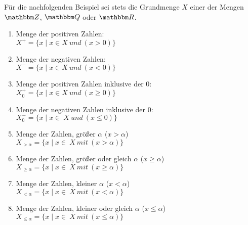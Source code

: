 \begin{Unit}[Beispiel]
Für die nachfolgenden Beispiel sei stets die Grundmenge $X$ einer der Mengen
$\ZZ$, $\QQ$ oder $\RR$.

\begin{enumerate}
  \item Menge der positiven Zahlen: \\
    $ X^+ = \{ x \mid x \in X\ und\ (x > 0) \} $

  \item Menge der negativen Zahlen: \\
    $ X^- = \{ x \mid x \in X\ und\ (x < 0) \} $

  \item Menge der positiven Zahlen inklusive der 0:  \\ 
    $ X^+_0 = \{ x \mid x \in X\ und\ (x \geq 0)\} $

  \item Menge der negativen Zahlen inklusive der 0:  \\ 
    $ X^-_0 = \{ x \mid x \in\ X\ und\ (x \leq 0)\} $

  \item Menge der Zahlen, größer $\alpha$ ($x > \alpha$) \\
    $ X_{>\alpha} = \{ x \mid x \in\ X\ mit\ (x > \alpha)\} $

  \item Menge der Zahlen, größer oder gleich $\alpha$ 
    ($x \geq \alpha$) \\
    $ X_{\geq \alpha} = \{ x \mid x \in\ X\ mit\ (x \geq \alpha)\} $

  \item Menge der Zahlen, kleiner $\alpha$ ($x < \alpha$) \\
    $ X_{< \alpha} = \{ x \mid x \in\ X\ mit\ (x < \alpha)\} $

  \item Menge der Zahlen, kleiner oder gleich $\alpha$ 
    ($x \leq \alpha$) \\
    $ X_{\leq \alpha} = \{ x \mid x \in\ X\ mit\ (x \leq \alpha)\} $
  \end{enumerate}
\end{Unit}

